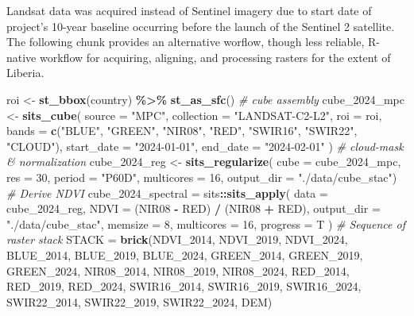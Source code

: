 \documentclass[
]{article}
\newenvironment{Shaded}{\begin{snugshade}}{\end{snugshade}}
\newcommand{\AttributeTok}[1]{\textcolor[rgb]{0.13,0.29,0.53}{#1}}
\newcommand{\CommentTok}[1]{\textcolor[rgb]{0.56,0.35,0.01}{\textit{#1}}}
\newcommand{\DecValTok}[1]{\textcolor[rgb]{0.00,0.00,0.81}{#1}}
\newcommand{\FunctionTok}[1]{\textcolor[rgb]{0.13,0.29,0.53}{\textbf{#1}}}
\newcommand{\NormalTok}[1]{#1}
\newcommand{\OtherTok}[1]{\textcolor[rgb]{0.56,0.35,0.01}{#1}}
\newcommand{\SpecialCharTok}[1]{\textcolor[rgb]{0.81,0.36,0.00}{\textbf{#1}}}
\newcommand{\StringTok}[1]{\textcolor[rgb]{0.31,0.60,0.02}{#1}}
\begin{document}
Landsat data was acquired instead of Sentinel imagery due to start date
of project's 10-year baseline occurring before the launch of the
Sentinel 2 satellite. The following chunk provides an alternative
worflow, though less reliable, R-native workflow for acquiring,
aligning, and processing rasters for the extent of Liberia.

\begin{Shaded}
\begin{Highlighting}[]
\NormalTok{roi }\OtherTok{\textless{}{-}} \FunctionTok{st\_bbox}\NormalTok{(country) }\SpecialCharTok{\%\textgreater{}\%} \FunctionTok{st\_as\_sfc}\NormalTok{()}
\CommentTok{\# cube assembly}
\NormalTok{cube\_2024\_mpc }\OtherTok{\textless{}{-}} \FunctionTok{sits\_cube}\NormalTok{(}
  \AttributeTok{source      =} \StringTok{"MPC"}\NormalTok{,}
  \AttributeTok{collection  =} \StringTok{"LANDSAT{-}C2{-}L2"}\NormalTok{,}
  \AttributeTok{roi         =}\NormalTok{ roi,}
  \AttributeTok{bands       =} \FunctionTok{c}\NormalTok{(}\StringTok{"BLUE"}\NormalTok{, }\StringTok{"GREEN"}\NormalTok{, }\StringTok{"NIR08"}\NormalTok{, }\StringTok{"RED"}\NormalTok{, }\StringTok{"SWIR16"}\NormalTok{, }\StringTok{"SWIR22"}\NormalTok{, }\StringTok{"CLOUD"}\NormalTok{),}
  \AttributeTok{start\_date  =} \StringTok{"2024{-}01{-}01"}\NormalTok{,}
  \AttributeTok{end\_date    =} \StringTok{"2024{-}02{-}01"}
\NormalTok{  )}
\CommentTok{\# cloud{-}mask \& normalization}
\NormalTok{cube\_2024\_reg }\OtherTok{\textless{}{-}} \FunctionTok{sits\_regularize}\NormalTok{(}
  \AttributeTok{cube        =}\NormalTok{ cube\_2024\_mpc,}
  \AttributeTok{res         =} \DecValTok{30}\NormalTok{,}
  \AttributeTok{period      =} \StringTok{"P60D"}\NormalTok{,}
  \AttributeTok{multicores  =} \DecValTok{16}\NormalTok{,}
  \AttributeTok{output\_dir  =} \StringTok{"./data/cube\_stac"}\NormalTok{)}
\CommentTok{\# Derive NDVI}
\NormalTok{cube\_2024\_spectral }\OtherTok{=}\NormalTok{ sits}\SpecialCharTok{::}\FunctionTok{sits\_apply}\NormalTok{(}
  \AttributeTok{data        =}\NormalTok{ cube\_2024\_reg,}
  \AttributeTok{NDVI        =}\NormalTok{ (NIR08 }\SpecialCharTok{{-}}\NormalTok{ RED) }\SpecialCharTok{/}\NormalTok{ (NIR08 }\SpecialCharTok{+}\NormalTok{ RED), }
  \AttributeTok{output\_dir  =} \StringTok{"./data/cube\_stac"}\NormalTok{,}
  \AttributeTok{memsize     =} \DecValTok{8}\NormalTok{,}
  \AttributeTok{multicores  =} \DecValTok{16}\NormalTok{,}
  \AttributeTok{progress    =}\NormalTok{ T}
\NormalTok{  )}
\CommentTok{\# Sequence of raster stack}
\NormalTok{STACK }\OtherTok{=} \FunctionTok{brick}\NormalTok{(NDVI\_2014, NDVI\_2019, NDVI\_2024,}
\NormalTok{          BLUE\_2014, BLUE\_2019, BLUE\_2024, }
\NormalTok{          GREEN\_2014, GREEN\_2019, GREEN\_2024,}
\NormalTok{          NIR08\_2014, NIR08\_2019, NIR08\_2024, }
\NormalTok{          RED\_2014, RED\_2019, RED\_2024, }
\NormalTok{          SWIR16\_2014, SWIR16\_2019, SWIR16\_2024, }
\NormalTok{          SWIR22\_2014, SWIR22\_2019, SWIR22\_2024,}
\NormalTok{          DEM)}
\end{Highlighting}
\end{Shaded}
\end{document}
